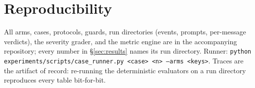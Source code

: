 \documentclass{article}
\begin{document}
\section{Reproducibility}\label{app:repro}
All arms, cases, protocols, guards, run directories (events, prompts, per-message verdicts), the severity grader, and the metric engine are in the accompanying repository; every number in \S\ref{sec:results} names its run directory. Runner: \texttt{python experiments/scripts/case\_runner.py <case> <n> --arms <keys>}. Traces are the artifact of record: re-running the deterministic evaluators on a run directory reproduces every table bit-for-bit.
\end{document}
